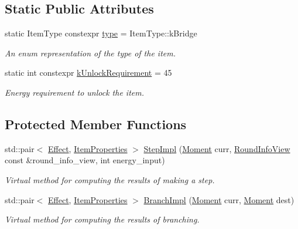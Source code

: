 \subsection*{Static Public Attributes}
\begin{DoxyCompactItemize}
\item 
static Item\+Type constexpr \hyperlink{classitem_1_1_bridge_aeb376b4b999ec6144454cd806e5e06d2}{type} = Item\+Type\+::k\+Bridge
\begin{DoxyCompactList}\small\item\em An enum representation of the type of the item. \end{DoxyCompactList}\item 
\mbox{\label{classitem_1_1_bridge_ad779bb244833ce97048e1a105ff09a8f}} 
static int constexpr \hyperlink{classitem_1_1_bridge_ad779bb244833ce97048e1a105ff09a8f}{k\+Unlock\+Requirement} = 45
\begin{DoxyCompactList}\small\item\em Energy requirement to unlock the item. \end{DoxyCompactList}\end{DoxyCompactItemize}
\subsection*{Protected Member Functions}
\begin{DoxyCompactItemize}
\item 
std\+::pair$<$ \hyperlink{classitem_1_1_effect}{Effect}, \hyperlink{classitem_1_1_item_properties}{Item\+Properties} $>$ \hyperlink{classitem_1_1_bridge_a08aa3fdb36e203e489bc0af65dde451c}{Step\+Impl} (\hyperlink{classtimeplane_1_1_moment}{Moment} curr, \hyperlink{classroundinfo_1_1_round_info_view}{Round\+Info\+View} const \&round\+\_\+info\+\_\+view, int energy\+\_\+input)
\begin{DoxyCompactList}\small\item\em Virtual method for computing the results of making a step. \end{DoxyCompactList}\item 
std\+::pair$<$ \hyperlink{classitem_1_1_effect}{Effect}, \hyperlink{classitem_1_1_item_properties}{Item\+Properties} $>$ \hyperlink{classitem_1_1_bridge_a175b2a911174c682ea163bc248836a87}{Branch\+Impl} (\hyperlink{classtimeplane_1_1_moment}{Moment} curr, \hyperlink{classtimeplane_1_1_moment}{Moment} dest)
\begin{DoxyCompactList}\small\item\em Virtual method for computing the results of branching. \end{DoxyCompactList}\end{DoxyCompactItemize}
